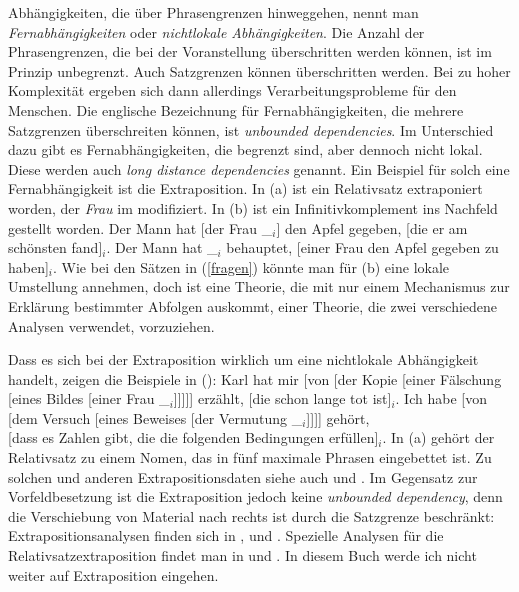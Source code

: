 Abhängigkeiten, die über Phrasengrenzen hinweggehen, nennt man
\emph{Fernabhängigkeiten} oder \emph{nichtlokale Abhängigkeiten}. Die Anzahl der Phrasengrenzen, die bei der Voranstellung überschritten werden können, ist im Prinzip
unbegrenzt. Auch Satzgrenzen können überschritten werden. Bei zu hoher Komplexität ergeben sich
dann allerdings Verarbeitungsprobleme für den Menschen. 
Die englische Bezeichnung für Fernabhängigkeiten, die mehrere Satzgrenzen überschreiten können,
ist \emph{unbounded dependencies}. Im Unterschied dazu gibt es Fernabhängigkeiten, die
begrenzt sind, aber dennoch nicht lokal. Diese werden auch \emph{long distance dependencies}
genannt. Ein Beispiel für solch eine Fernabhängigkeit ist die Extraposition.
In (a) ist ein Relativsatz extraponiert worden, der \emph{Frau} im \mf modifiziert.
In (b) ist ein Infinitivkomplement ins Nachfeld gestellt worden. 
\eal
\label{bsp-extrap}
\ex Der Mann hat [der Frau \_$_i$] den Apfel gegeben, [die er am schönsten fand]$_i$.
\ex Der Mann hat \_$_i$ behauptet, [einer Frau den Apfel gegeben zu haben]$_i$.
\zl
Wie bei den Sätzen
in (\ref{fragen}) könnte man für (b) eine lokale Umstellung annehmen, doch ist eine
Theorie, die mit nur einem Mechanismus zur Erklärung bestimmter Abfolgen auskommt, einer
Theorie, die zwei verschiedene Analysen verwendet, vorzuziehen.

Dass es sich bei der Extraposition wirklich um eine nichtlokale Abhängigkeit handelt,
zeigen die Beispiele in ():
\eal
\ex Karl hat mir [von [der Kopie [einer Fälschung [eines Bildes [einer Frau \_$_i$]]]]] erzählt,
    [die schon lange tot ist]$_i$.
\ex Ich habe [von [dem Versuch [eines Beweises [der Vermutung \_$_i$]]]] gehört,\\
       {}[dass es Zahlen gibt, die die folgenden Bedingungen erfüllen]$_i$.
\zl
In (a) gehört der Relativsatz zu einem Nomen, das in fünf maximale Phrasen eingebettet
ist. Zu solchen und anderen Extrapositionsdaten siehe auch 
und . Im Gegensatz zur Vorfeldbesetzung ist die Extraposition jedoch keine
\emph{unbounded dependency}, denn die Verschiebung von Material nach rechts ist durch die Satzgrenze
beschränkt:
\eal
{}
\zl
Extrapositionsanalysen finden sich in \citealp{Keller95b}, \citealp{Bouma96} und
\citealp[Kapitel~13.2]{Mueller99a}. Spezielle Analysen für die Relativsatzextraposition findet man in
 und . In diesem Buch werde ich nicht weiter auf Extraposition
eingehen.

